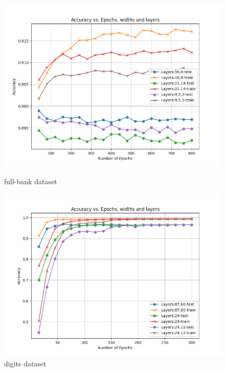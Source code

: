 \documentclass[8pt]{article}
\begin{document}
\begin{figure}[H]
    \begin{minipage}{0.32\textwidth}
        \centering
        \includegraphics[width=\textwidth]{../Prob2/out/task4/full_bank/AccVsLayer_maxe800_layer_1031_182425.png}
        \caption{full-bank dataset}
        \label{fig:AccVsLayer_maxe800_layer_1031_182425 on full-bank dataset}
    \end{minipage}
    \begin{minipage}{0.32\textwidth}
        \centering
        \includegraphics[width=\textwidth]{../Prob2/out/task4/digits/AccVsLayer_maxe300_layer_1031_175430.png}
        \caption{digits dataset}
        \label{fig:AccVsLayer_maxe300_layer_1031_175430 on digits dataset}
    \end{minipage}

\end{figure}
\end{document}
